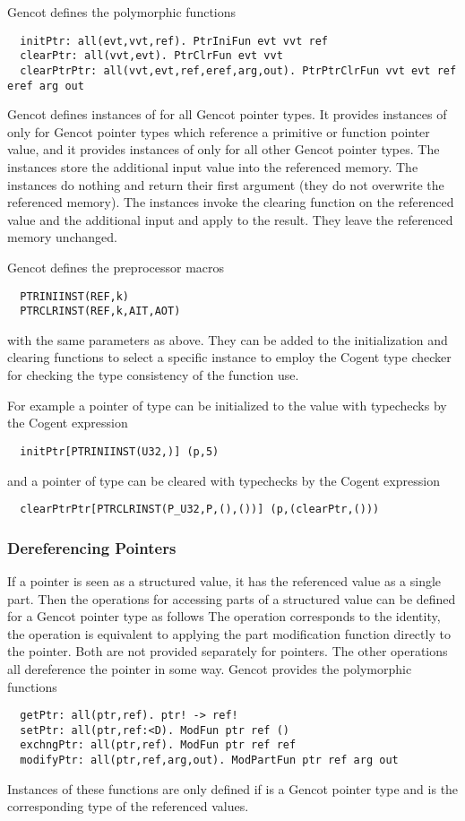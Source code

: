 Gencot defines the polymorphic functions
\begin{verbatim}
  initPtr: all(evt,vvt,ref). PtrIniFun evt vvt ref
  clearPtr: all(vvt,evt). PtrClrFun evt vvt
  clearPtrPtr: all(vvt,evt,ref,eref,arg,out). PtrPtrClrFun vvt evt ref eref arg out
\end{verbatim}
Gencot defines instances of  for all Gencot pointer types. It provides instances of  only for Gencot pointer types which
reference a primitive or function pointer value, and it provides instances of  only for all other Gencot pointer types.
The  instances store the additional input value 
into the referenced memory. The  instances do nothing and return their first argument (they do not overwrite the referenced memory).
The  instances invoke the clearing function on the referenced value and the additional input and apply  to the result.
They leave the referenced memory unchanged. 

Gencot defines the preprocessor macros
\begin{verbatim}
  PTRINIINST(REF,k)
  PTRCLRINST(REF,k,AIT,AOT)
\end{verbatim}
with the same parameters as above. They can be added to the initialization and clearing functions to select a specific instance
to employ the Cogent type checker for checking the type consistency of the function use.

For example a pointer  of type  can be initialized to the value  with typechecks by the Cogent expression
\begin{verbatim}
  initPtr[PTRINIINST(U32,)] (p,5)
\end{verbatim}
and a pointer  of type  can be cleared with typechecks by the Cogent expression
\begin{verbatim}
  clearPtrPtr[PTRCLRINST(P_U32,P,(),())] (p,(clearPtr,()))
\end{verbatim}

\subsubsection{Dereferencing Pointers}

If a pointer is seen as a structured value, it has the referenced value as a single part.
Then the operations for accessing parts of a structured value can be defined for a Gencot pointer type as follows
The operation  corresponds to the identity, the operation  is equivalent to applying the
part modification function directly to the pointer. Both are not provided separately for pointers.
The other operations all dereference the pointer in some way. Gencot provides the polymorphic functions
\begin{verbatim}
  getPtr: all(ptr,ref). ptr! -> ref! 
  setPtr: all(ptr,ref:<D). ModFun ptr ref ()
  exchngPtr: all(ptr,ref). ModFun ptr ref ref
  modifyPtr: all(ptr,ref,arg,out). ModPartFun ptr ref arg out
\end{verbatim}
Instances of these functions are only defined if  is a Gencot pointer type and  is the corresponding
type of the referenced values. 


